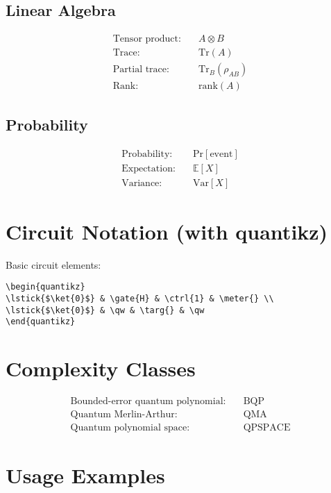 \documentclass[12pt]{article}
\newcommand{\ket}[1]{|#1\rangle}
\newcommand{\tensor}{\otimes}
\newcommand{\tr}{\text{Tr}}
\newcommand{\ptr}[1]{\text{Tr}_{#1}}
\newcommand{\BQP}{\text{BQP}}
\newcommand{\QMA}{\text{QMA}}
\newcommand{\QPSPACE}{\text{QPSPACE}}
\newcommand{\qw}{\qw}
\newcommand{\gate}[1]{\gate{#1}}
\newcommand{\ctrl}{\ctrl{1}}
\newcommand{\targ}{\targ{}}
\newcommand{\meter}{\meter{}}
\newcommand{\rank}{\text{rank}}
\newcommand{\prob}[1]{\text{Pr}[#1]}
\newcommand{\expect}[1]{\mathbb{E}[#1]}
\newcommand{\var}[1]{\text{Var}[#1]}
\theoremstyle{definition}
\theoremstyle{remark}
\begin{document}
\begin{multicols}{2}
\subsection{Linear Algebra}
\begin{align}
\text{Tensor product:} &\quad A \tensor B \\
\text{Trace:} &\quad \tr(A) \\
\text{Partial trace:} &\quad \ptr{B}(\rho_{AB}) \\
\text{Rank:} &\quad \rank(A)
\end{align}

\subsection{Probability}
\begin{align}
\text{Probability:} &\quad \prob{\text{event}} \\
\text{Expectation:} &\quad \expect{X} \\
\text{Variance:} &\quad \var{X}
\end{align}

\section{Circuit Notation (with quantikz)}

Basic circuit elements:
\begin{verbatim}
\begin{quantikz}
\lstick{$\ket{0}$} & \gate{H} & \ctrl{1} & \meter{} \\
\lstick{$\ket{0}$} & \qw & \targ{} & \qw
\end{quantikz}
\end{verbatim}

\section{Complexity Classes}

\begin{align}
\text{Bounded-error quantum polynomial:} &\quad \BQP \\
\text{Quantum Merlin-Arthur:} &\quad \QMA \\
\text{Quantum polynomial space:} &\quad \QPSPACE
\end{align}

\end{multicols}

\section{Usage Examples}
\end{document}
